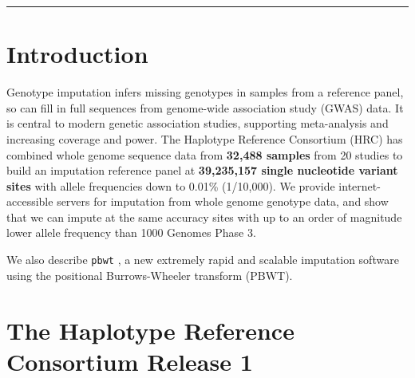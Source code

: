 \documentclass[a0,landscape]{a0poster}
\begin{document}
\vspace{-1.75cm}
\begin{center}\noindent\rule{112cm}{0.01pt}\end{center}


\begin{multicols}{3}


\section*{Introduction}

Genotype imputation infers missing genotypes in samples from a reference panel, so can fill in full sequences from genome-wide association study (GWAS) data.
It is central to modern genetic association studies, supporting meta-analysis and increasing coverage and power.
The Haplotype Reference Consortium (HRC) has combined whole genome sequence data from \textbf{32,488 samples} from 20 studies to build an imputation reference panel at \textbf{39,235,157 single nucleotide variant sites} with allele frequencies down to 0.01\% (1/10,000).
We provide internet-accessible servers for imputation from whole genome genotype data, and show that we can impute at the same accuracy sites with up to an order of magnitude lower allele frequency than 1000 Genomes Phase 3.

We also describe \texttt{pbwt} \cite{durbin2014efficient}, a new extremely rapid and scalable imputation software using the positional Burrows-Wheeler transform (PBWT).

\vspace{-0.5cm}

\section*{The Haplotype Reference Consortium Release 1}



\end{multicols}
\end{document}
